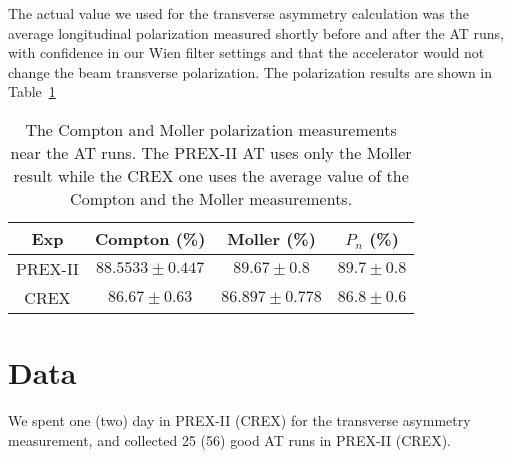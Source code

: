The actual value we used for the transverse asymmetry calculation was the 
average longitudinal polarization measured shortly before and after the AT runs, 
with confidence in our Wien filter settings and that the accelerator 
would not change the beam transverse polarization. 
The polarization results are shown in Table~\ref{tab:AT_polarization}
\begin{table}[!h]
    \centering
    \begin{tabular}{c | c c c}
    \hline
    Exp	& Compton (\%)	& Moller (\%)	& $P_n$ (\%) \\
    \hline
    PREX-II & $88.5533 \pm 0.447$   & $89.67 \pm 0.8$	& $89.7 \pm 0.8$  \\
    CREX    & $86.67 \pm 0.63$	& $86.897 \pm 0.778$	& $86.8 \pm 0.6$  \\
    \hline
    \end{tabular}
    \caption[AT Polarization]
    {The Compton and Moller polarization measurements near the AT runs. 
    The PREX-II AT uses only the Moller result while the CREX one uses the average value of the 
    Compton and the Moller measurements.}
    \label{tab:AT_polarization}
\end{table}

\section{Data}

We spent one (two) day in PREX-II (CREX) for the transverse asymmetry measurement,
and collected 25 (56) good AT runs in PREX-II (CREX).

